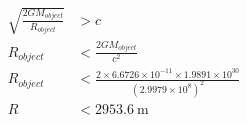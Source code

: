 \begin{align*}
\sqrt{\frac{2GM_{object}}{R_{object}}} &> c \tag*{(4 points)}\\
R_{object} &< \frac{2GM_{object}}{c^2} \tag*{(2 points)}\\
R_{object} &< \frac{2 \times 6.6726 \times 10^{-11} \times 1.9891 \times 10^{30}}
                  {(2.9979 \times 10^{8})^2}\\
R &< 2953.6~\mathrm{m} \tag*{(4 points)}
\end{align*}
